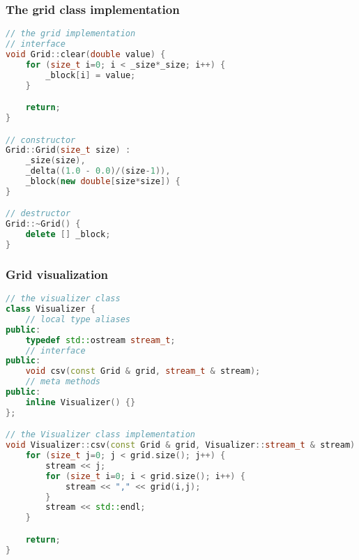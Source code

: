 \begin{frame}[fragile]
%
  \frametitle{The grid class implementation}
%
  \begin{lstlisting}[language=c++,name=seq:grid]
// the grid implementation
// interface
void Grid::clear(double value) {
    for (size_t i=0; i < _size*_size; i++) {
        _block[i] = value;
    }

    return;
}

// constructor
Grid::Grid(size_t size) :
    _size(size), 
    _delta((1.0 - 0.0)/(size-1)),
    _block(new double[size*size]) {
}

// destructor
Grid::~Grid() {
    delete [] _block;
}

  \end{lstlisting}
%
\end{frame}

\begin{frame}[fragile]
%
  \frametitle{Grid visualization}
%
  \begin{lstlisting}[language=c++,name=seq:visualizer,firstnumer=97]
// the visualizer class
class Visualizer {
    // local type aliases
public:
    typedef std::ostream stream_t;
    // interface
public:
    void csv(const Grid & grid, stream_t & stream);
    // meta methods
public:
    inline Visualizer() {}
};

// the Visualizer class implementation
void Visualizer::csv(const Grid & grid, Visualizer::stream_t & stream) {
    for (size_t j=0; j < grid.size(); j++) {
        stream << j;
        for (size_t i=0; i < grid.size(); i++) {
            stream << "," << grid(i,j);
        }
        stream << std::endl;
    }

    return;
}

  \end{lstlisting}
%
\end{frame}

